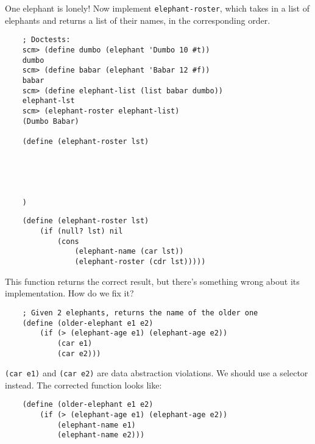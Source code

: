     \begin{blocksection}
    \question One elephant is lonely! Now implement \lstinline{elephant-roster}, which takes in a list of elephants and returns a list of their names, in the corresponding order. 
    
    \begin{lstlisting}
    ; Doctests: 
    scm> (define dumbo (elephant 'Dumbo 10 #t))
    dumbo
    scm> (define babar (elephant 'Babar 12 #f))
    babar
    scm> (define elephant-list (list babar dumbo))
    elephant-lst
    scm> (elephant-roster elephant-list)
    (Dumbo Babar)
    
    (define (elephant-roster lst) 
    
    
    
    
    
    )
    \end{lstlisting}
    \begin{solution}[1in]
    \begin{lstlisting}
    (define (elephant-roster lst) 
        (if (null? lst) nil 
            (cons 
                (elephant-name (car lst)) 
                (elephant-roster (cdr lst)))))
    \end{lstlisting}
    \end{solution}
    \end{blocksection}
    
    
    \begin{blocksection}
    \question This function returns the correct result, but there's something wrong
    about its implementation. How do we fix it?
        
    \begin{lstlisting}
    ; Given 2 elephants, returns the name of the older one
    (define (older-elephant e1 e2) 
        (if (> (elephant-age e1) (elephant-age e2))
            (car e1)
            (car e2))) 
    \end{lstlisting}
    \begin{solution}[1in]
    \lstinline{(car e1)} and \lstinline{(car e2)} are data abstraction violations. 
    We should use a selector instead.
    The corrected function looks like:
    \begin{lstlisting}
    (define (older-elephant e1 e2) 
        (if (> (elephant-age e1) (elephant-age e2))
            (elephant-name e1)
            (elephant-name e2))) 
    \end{lstlisting}
    \end{solution}
    \end{blocksection}
    
